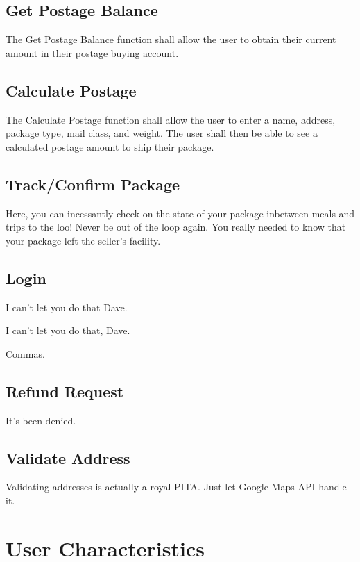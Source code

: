 \documentclass{scrreprt}
\begin{document}
\subsection{Get Postage Balance}

The Get Postage Balance function shall allow the user to obtain their current
amount in their postage buying account.

\subsection{Calculate Postage}

The Calculate Postage function shall allow the user to enter a name, address,
package type, mail class, and weight. The user shall then be able to see a
calculated postage amount to ship their package.

\subsection{Track/Confirm Package}

Here, you can incessantly check on the state of your package inbetween meals 
and trips to the loo! Never be out of the loop again. You really needed to 
know that your package left the seller's facility.

\subsection{Login}

I can't let you do that Dave.

I can't let you do that, Dave.

Commas.

\subsection{Refund Request}

It's been denied.

\subsection{Validate Address}

Validating addresses is actually a royal PITA. Just let Google Maps API 
handle it.

\section{User Characteristics}
\end{document}
